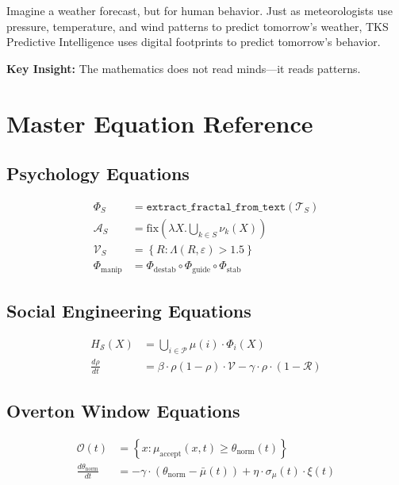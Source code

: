 \documentclass[11pt,twoside]{book}
\newcommand{\noe}[1]{\nu_{#1}}
\newcommand{\Frac}{\Phi}
\newcommand{\Lacunarity}{\Lambda}
\newcommand{\fix}{\mathrm{fix}}
\newcommand{\PsychAttractor}{\mathcal{A}}
\newcommand{\ManipFrac}{\Phi_{\mathrm{manip}}}
\newcommand{\ProfileFrac}{\Phi}
\newcommand{\VulnSet}{\mathcal{V}}
\newcommand{\TextCorpus}{\mathcal{T}}
\newcommand{\Overton}{\mathcal{O}}
\theoremstyle{definition}
\theoremstyle{plain}
\theoremstyle{remark}
\begin{document}
\begin{tcolorbox}[colback=green!5!white,colframe=green!65!black,title=\textbf{Plain English: The ``Behavioral Weather Forecast''},breakable]
Imagine a weather forecast, but for human behavior. Just as meteorologists use pressure, temperature, and wind patterns to predict tomorrow's weather, TKS Predictive Intelligence uses digital footprints to predict tomorrow's behavior.

\textbf{Key Insight:} The mathematics does not read minds---it reads patterns.
\end{tcolorbox}

\appendix
\chapter{Master Equation Reference}
\label{app:equations}

\section{Psychology Equations}
\begin{align}
\ProfileFrac_S &= \texttt{extract\_fractal\_from\_text}(\TextCorpus_S) \tag{Profile} \\
\PsychAttractor_S &= \fix\left(\lambda X. \bigcup_{k \in S} \noe{k}(X)\right) \tag{Attractor} \\
\VulnSet_S &= \left\{ R : \Lacunarity(R, \varepsilon) > 1.5 \right\} \tag{Vulnerability} \\
\ManipFrac &= \Frac_{\mathrm{destab}} \circ \Frac_{\mathrm{guide}} \circ \Frac_{\mathrm{stab}} \tag{Intervention}
\end{align}

\section{Social Engineering Equations}
\begin{align}
H_{\mathcal{S}}(X) &= \bigcup_{i \in \mathcal{P}} \mu(i) \cdot \Frac_i(X) \tag{Collective} \\
\frac{d\rho}{dt} &= \beta \cdot \rho(1 - \rho) \cdot \mathcal{V} - \gamma \cdot \rho \cdot (1 - \mathcal{R}) \tag{Cascade}
\end{align}

\section{Overton Window Equations}
\begin{align}
\Overton(t) &= \left\{ x : \mu_{\mathrm{accept}}(x, t) \geq \theta_{\mathrm{norm}}(t) \right\} \tag{Window} \\
\frac{d\theta_{\mathrm{norm}}}{dt} &= -\gamma \cdot (\theta_{\mathrm{norm}} - \bar{\mu}(t)) + \eta \cdot \sigma_{\mu}(t) \cdot \xi(t) \tag{Dynamics}
\end{align}
\end{document}

